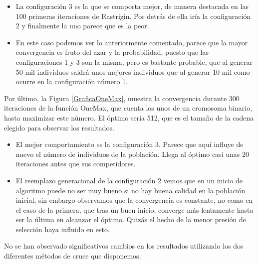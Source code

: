 \documentclass[runningheads]{llncs}
\begin{document}
\begin{itemize}
 \item La configuración 3 es la que se comporta mejor, de manera destacada en las 100 primeras iteraciones de Rastrigin. Por detrás 
 de ella iría la configuración 2 y finalmente la uno parece que es la peor.
 \item En este caso podemos ver lo anteriormente comentado, parece que la mayor convergencia es fruto del azar y 
 la probabilidad, puesto que las configuraciones 1 y 3 son la misma, pero es bastante probable, que al generar 50 mil individuos 
 saldrá unos mejores individuos que al generar 10 mil como ocurre en la configuración número 1.
\end{itemize}




Por último, la Figura \ref{GraficaOneMax}, muestra la convergencia durante 300 iteraciones de la función OneMax, que cuenta 
los unos de un cromosoma binario, hasta maximizar este número. El  óptimo sería 512, que es el tamaño de la cadena elegido 
para observar los resultados.

\begin{itemize}
 \item El mejor comportamiento es la configuración 3. Parece que aquí influye de nuevo el número de individuos de la población. 
 Llega al óptimo casi unas 20 iteraciones antes que sus competidores.
 \item El reemplazo generacional de la configuración 2 vemos que en un inicio de algoritmo puede no ser muy bueno si no hay buena 
 calidad en la población inicial, sin embargo observamos que la convergencia es constante, no como en el caso de la primera, que 
 tras un buen inicio, converge más lentamente hasta ser la última en alcanzar el óptimo. Quizás el hecho de la menor presión 
 de selección haya influido en esto.
\end{itemize}





No se han observado significativos cambios en los resultados utilizando los dos diferentes métodos de cruce que disponemos. 
\end{document}
